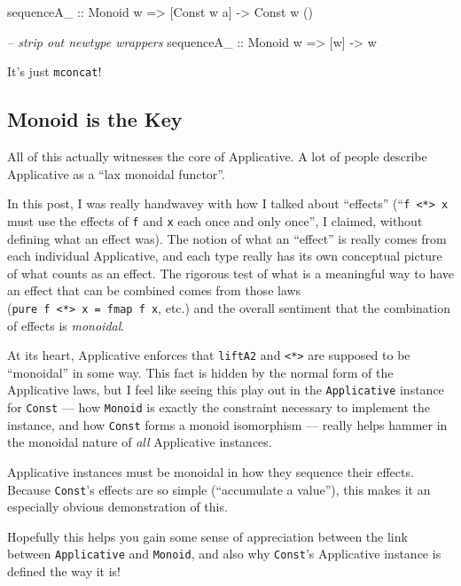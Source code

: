 \documentclass[]{article}
\newenvironment{Shaded}{}{}
\newcommand{\CommentTok}[1]{\textcolor[rgb]{0.38,0.63,0.69}{\textit{#1}}}
\newcommand{\DataTypeTok}[1]{\textcolor[rgb]{0.56,0.13,0.00}{#1}}
\newcommand{\NormalTok}[1]{#1}
\newcommand{\OtherTok}[1]{\textcolor[rgb]{0.00,0.44,0.13}{#1}}
\begin{document}
\begin{Shaded}
\begin{Highlighting}[]
\OtherTok{sequenceA_ ::} \DataTypeTok{Monoid}\NormalTok{ w }\OtherTok{=>}\NormalTok{ [}\DataTypeTok{Const}\NormalTok{ w a] }\OtherTok{->} \DataTypeTok{Const}\NormalTok{ w ()}

\CommentTok{-- strip out newtype wrappers}
\OtherTok{sequenceA_ ::} \DataTypeTok{Monoid}\NormalTok{ w }\OtherTok{=>}\NormalTok{ [w] }\OtherTok{->}\NormalTok{ w}
\end{Highlighting}
\end{Shaded}

It's just \texttt{mconcat}!

\hypertarget{monoid-is-the-key}{%
\subsection{Monoid is the Key}\label{monoid-is-the-key}}

All of this actually witnesses the core of Applicative. A lot of people describe
Applicative as a ``lax monoidal functor''.

In this post, I was really handwavey with how I talked about ``effects''
(``\texttt{f\ \textless{}*\textgreater{}\ x} must use the effects of \texttt{f}
and \texttt{x} each once and only once'', I claimed, without defining what an
effect was). The notion of what an ``effect'' is really comes from each
individual Applicative, and each type really has its own conceptual picture of
what counts as an effect. The rigorous test of what is a meaningful way to have
an effect that can be combined comes from those laws
(\texttt{pure\ f\ \textless{}*\textgreater{}\ x\ =\ fmap\ f\ x}, etc.) and the
overall sentiment that the combination of effects is \emph{monoidal}.

At its heart, Applicative enforces that \texttt{liftA2} and
\texttt{\textless{}*\textgreater{}} are supposed to be ``monoidal'' in some way.
This fact is hidden by the normal form of the Applicative laws, but I feel like
seeing this play out in the \texttt{Applicative} instance for \texttt{Const} ---
how \texttt{Monoid} is exactly the constraint necessary to implement the
instance, and how \texttt{Const} forms a monoid isomorphism --- really helps
hammer in the monoidal nature of \emph{all} Applicative instances.

Applicative instances must be monoidal in how they sequence their effects.
Because \texttt{Const}'s effects are so simple (``accumulate a value''), this
makes it an especially obvious demonstration of this.

Hopefully this helps you gain some sense of appreciation between the link
between \texttt{Applicative} and \texttt{Monoid}, and also why \texttt{Const}'s
Applicative instance is defined the way it is!
\end{document}
